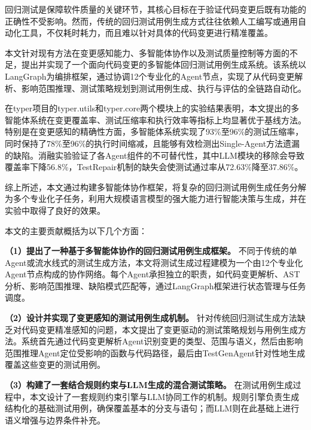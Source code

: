 
\begin{conclusion}

  回归测试是保障软件质量的关键环节，其核心目标在于验证代码变更后既有功能的正确性不受影响。然而，传统的回归测试用例生成方式往往依赖人工编写或通用自动化工具，不仅耗时耗力，而且难以针对具体的代码变更进行精准覆盖。

  本文针对现有方法在变更感知能力、多智能体协作以及测试质量控制等方面的不足，提出并实现了一个面向代码变更的多智能体回归测试用例生成系统。该系统以LangGraph为编排框架，通过协调12个专业化的Agent节点，实现了从代码变更解析、影响范围推理、测试策略规划到测试用例生成、执行与评估的全链路自动化。

  在typer项目的typer.utils和typer.core两个模块上的实验结果表明，本文提出的多智能体系统在变更覆盖率、测试压缩率和执行效率等指标上均显著优于基线方法。特别是在变更感知的精确性方面，多智能体系统实现了93\%至96\%的测试压缩率，同时保持了78\%至96\%的执行时间缩减，且能够有效检测出Single-Agent方法遗漏的缺陷。消融实验验证了各Agent组件的不可替代性，其中LLM模块的移除会导致覆盖率下降56.8\%，TestRepair机制的缺失会使测试通过率从72.63\%降至37.86\%。

  综上所述，本文通过构建多智能体协作框架，将复杂的回归测试用例生成任务分解为多个专业化子任务，利用大规模语言模型的强大能力进行智能决策与生成，并在实验中取得了良好的效果。

  本文的主要贡献概括为以下几个方面：

  \textbf{（1）提出了一种基于多智能体协作的回归测试用例生成框架。} 不同于传统的单Agent或流水线式的测试生成方法，本文将测试生成过程建模为一个由12个专业化Agent节点构成的协作网络。每个Agent承担独立的职责，如代码变更解析、AST分析、影响范围推理、缺陷模式匹配等，通过LangGraph框架进行状态管理与任务调度。

  \textbf{（2）设计并实现了变更感知的测试用例生成机制。} 针对传统回归测试生成方法缺乏对代码变更精准感知的问题，本文提出了变更驱动的测试策略规划与用例生成方法。系统首先通过代码变更解析Agent识别变更的类型、范围与语义，然后由影响范围推理Agent定位受影响的函数与代码路径，最后由TestGenAgent针对性地生成覆盖这些变更的测试用例。

  \textbf{（3）构建了一套结合规则约束与LLM生成的混合测试策略。} 在测试用例生成过程中，本文设计了一套规则约束引擎与LLM协同工作的机制。规则引擎负责生成结构化的基础测试用例，确保覆盖基本的分支与语句；而LLM则在此基础上进行语义增强与边界条件补充。


\end{conclusion}
